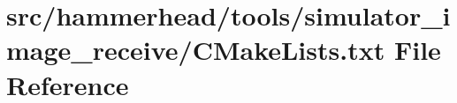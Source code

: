 \hypertarget{tools_2simulator__image__receive_2CMakeLists_8txt}{}\section{src/hammerhead/tools/simulator\+\_\+image\+\_\+receive/\+C\+Make\+Lists.txt File Reference}
\label{tools_2simulator__image__receive_2CMakeLists_8txt}
